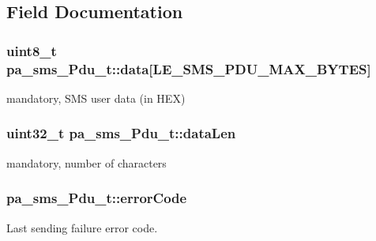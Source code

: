 \subsection{Field Documentation}
\subsubsection[{\texorpdfstring{data}{data}}]{\setlength{\rightskip}{0pt plus 5cm}uint8\+\_\+t pa\+\_\+sms\+\_\+\+Pdu\+\_\+t\+::data\mbox{[}{\bf L\+E\+\_\+\+S\+M\+S\+\_\+\+P\+D\+U\+\_\+\+M\+A\+X\+\_\+\+B\+Y\+T\+ES}\mbox{]}}\hypertarget{structpa__sms___pdu__t_a5fe8eb17b0b853fa61ca1ac6d813e63f}{}\label{structpa__sms___pdu__t_a5fe8eb17b0b853fa61ca1ac6d813e63f}


mandatory, S\+MS user data (in H\+EX) 

\subsubsection[{\texorpdfstring{data\+Len}{dataLen}}]{\setlength{\rightskip}{0pt plus 5cm}uint32\+\_\+t pa\+\_\+sms\+\_\+\+Pdu\+\_\+t\+::data\+Len}\hypertarget{structpa__sms___pdu__t_a540bfee9b53c597323088a0b9d39de3a}{}\label{structpa__sms___pdu__t_a540bfee9b53c597323088a0b9d39de3a}


mandatory, number of characters 

\subsubsection[{\texorpdfstring{error\+Code}{errorCode}}]{ pa\+\_\+sms\+\_\+\+Pdu\+\_\+t\+::error\+Code}\hypertarget{structpa__sms___pdu__t_a61e788793f81312aac8bbcef8e7e6e8d}{}\label{structpa__sms___pdu__t_a61e788793f81312aac8bbcef8e7e6e8d}


Last sending failure error code. 

